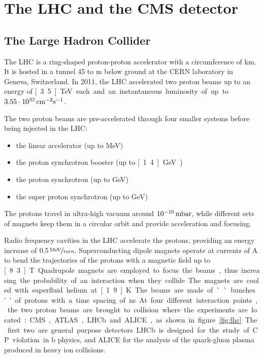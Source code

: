 \chapter{The LHC and the CMS detector}
\section{The Large Hadron Collider}
The LHC is a ring-shaped proton-proton accelerator with a circumference of
\unit[27]{km}. It is hosted in a tunnel 45 to \unit[170]{m} below ground at
the CERN laboratory in Geneva, Switzerland. In 2011, the LHC accelerated two
proton beams up to an energy of \unit[3.5]{TeV} each and an instantaneous
luminosity of up to $\unit[3.55\cdot 10^{33}]{cm^{-2}s^{-1}}$.

The two proton beams are pre-accelerated through four smaller systems before
being injected in the LHC:
\begin{itemize}
    \item the linear accelerator (up to \unit[50]{MeV})
    \item the proton synchrotron booster (up to \unit[1.4]{GeV})
    \item the proton synchrotron (up to \unit[26]{GeV})
    \item the super proton synchrotron (up to \unit[450]{GeV})
\end{itemize}

The protons travel in ultra-high vacuum around
$\unit[10^{-10}]{mbar}$, while different sets of magnets keep them in a
circular orbit and provide acceleration and focusing.

Radio frequency cavities in the LHC accelerate the protons, providing an energy
increase of $\unitfrac[0.5]{MeV}{turn}$.
Superconducting dipole magnets operate at currents of \unit[11850]{A} to bend the trajectories
of the protons with a magnetic field up to \unit[8.3]{T}.
Quadrupole magnets are employed to focus the beams, thus increasing the
probability of an interaction when they collide.
The magnets are cooled with superfluid helium at \unit[1.9]{K}.
The beams are made of ``bunches'' of protons with a time spacing of
\unit[75]{ns}.

At four different interaction points, the two proton beams are brought to
collision where the experiments are located: CMS, ATLAS, LHCb and ALICE, as
shown in figure~\ref{fig:lhc}.
The first two are general purpose detectors. LHCb is designed for the study
of CP violation in $\mathrm{b}$ physics, and ALICE for the analysis of the
quark-gluon plasma produced in heavy ion collisions.

